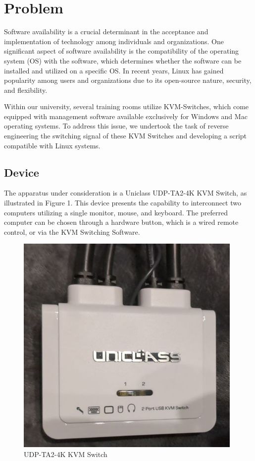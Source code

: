 \newpage

\section{Problem}
Software availability is a crucial determinant in the acceptance and implementation of technology among individuals and organizations. One significant aspect of software availability is the compatibility of the operating system (OS) with the software, which determines whether the software can be installed and utilized on a specific OS. In recent years, Linux has gained popularity among users and organizations due to its open-source nature, security, and flexibility.

Within our university, several training rooms utilize KVM-Switches, which come equipped with management software available exclusively for Windows and Mac operating systems. To address this issue, we undertook the task of reverse engineering the switching signal of these KVM Switches and developing a script compatible with Linux systems.

\subsection{Device}
The apparatus under consideration is a Uniclass UDP-TA2-4K KVM Switch, as illustrated in Figure 1. This device presents the capability to interconnect two computers utilizing a single monitor, mouse, and keyboard. The preferred computer can be chosen through a hardware button, which is a wired remote control, or via the KVM Switching Software.

\begin{figure}[htp!]
    \centering
    \includegraphics[width=11cm]{img/device.jpg}
    \caption{UDP-TA2-4K KVM Switch}
    \label{fig:UDP-TA2-4K KVM Switch}
\end{figure} 


